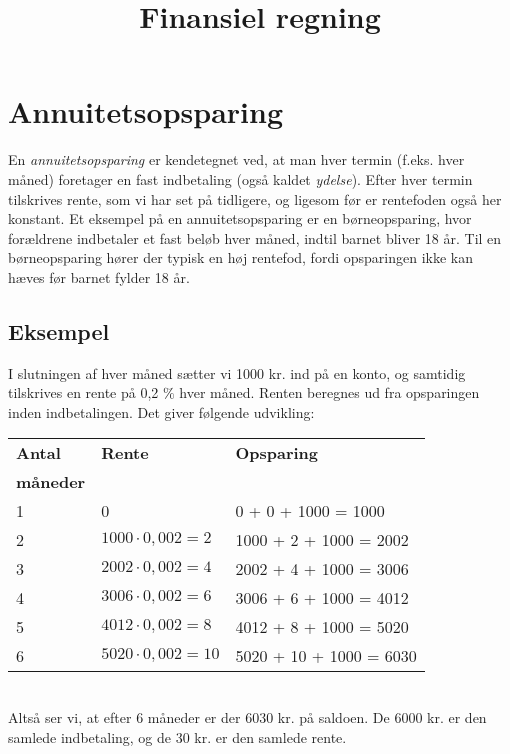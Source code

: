 \documentclass[12pt,oneside,a4paper]{article}
\title{Finansiel regning}
\date{\vspace{-5ex}}
\begin{document}
\maketitle


\section{Annuitetsopsparing}
En \emph{annuitetsopsparing} er kendetegnet ved, at man hver termin (f.eks. hver
måned) foretager en fast indbetaling (også kaldet \emph{ydelse}). Efter hver
termin tilskrives rente, som vi har set på tidligere, og ligesom før er
rentefoden også her konstant. Et eksempel på en annuitetsopsparing er en
børneopsparing, hvor forældrene indbetaler et fast beløb hver måned, indtil
barnet bliver 18 år. Til en børneopsparing hører der typisk en høj rentefod,
fordi opsparingen ikke kan hæves før barnet fylder 18 år.

\begin{tcolorbox}
\subsection{Eksempel}
I slutningen af hver måned sætter vi 1000 kr. ind på en konto, og samtidig
tilskrives en rente på 0,2 $\%$ hver måned. Renten beregnes ud fra
opsparingen inden indbetalingen.  Det giver følgende udvikling:
\\

\begin{tabular}{|l|l|l|}
    \hline
    \textbf{Antal} & \textbf{Rente} & \textbf{Opsparing} \\
    \textbf{måneder} &  & \\
    \hline
    1 & 0 & 0 + 0 + 1000 = 1000 \\
    \hline
    2 & $1000\cdot 0,002 = 2$ & 1000 + 2 + 1000 = 2002 \\
    \hline
    3 & $2002\cdot 0,002 = 4$ & 2002 + 4 + 1000 = 3006 \\
    \hline
    4 & $3006\cdot 0,002 = 6$ & 3006 + 6 + 1000 = 4012 \\
    \hline
    5 & $4012\cdot 0,002 = 8$ & 4012 + 8 + 1000 = 5020 \\
    \hline
    6 & $5020\cdot 0,002 = 10$ & 5020 + 10 + 1000 = 6030 \\
    \hline
\end{tabular}
\\

Altså ser vi, at efter 6 måneder er der 6030 kr. på saldoen. De 6000 kr. er den
samlede indbetaling, og de 30 kr. er den samlede rente.
\end{tcolorbox}
\end{document}
